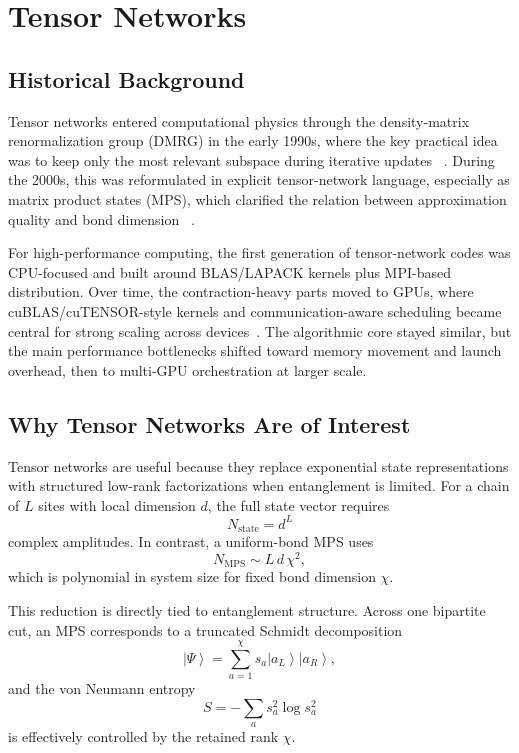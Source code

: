 \section{Tensor Networks}\label{sec:tensor-networks}

\subsection{Historical Background}\label{sec:tn-history}

Tensor networks entered computational physics through the density-matrix
renormalization group (DMRG) in the early 1990s, where the key practical idea
was to keep only the most relevant subspace during iterative updates
~\cite{white1992dmrg,white1993dmrg}. During the 2000s, this was reformulated in
explicit tensor-network language, especially as matrix product states (MPS),
which clarified the relation between approximation quality and bond dimension
~\cite{schollwock2011dmrg,orus2014practical-intro-tn}.

For high-performance computing, the first generation of tensor-network codes
was CPU-focused and built around BLAS/LAPACK kernels plus MPI-based
distribution. Over time, the contraction-heavy parts moved to GPUs, where
cuBLAS/cuTENSOR-style kernels and communication-aware scheduling became central
for strong scaling across devices~\cite{springer2017tensor,menczer2023massive,menczer2024efficient-dmrg-gpu}.
The algorithmic core stayed similar, but the main performance bottlenecks
shifted toward memory movement and launch overhead, then to multi-GPU
orchestration at larger scale.

\subsection{Why Tensor Networks Are of Interest}\label{sec:tn-interest}

Tensor networks are useful because they replace exponential state
representations with structured low-rank factorizations when entanglement is
limited. For a chain of $L$ sites with local dimension $d$, the full state
vector requires
\[
  N_{\text{state}} = d^L
\]
complex amplitudes. In contrast, a uniform-bond MPS uses
\[
  N_{\text{MPS}} \sim L\,d\,\chi^2,
\]
which is polynomial in system size for fixed bond dimension $\chi$.

This reduction is directly tied to entanglement structure. Across one bipartite
cut, an MPS corresponds to a truncated Schmidt decomposition
\[
  \left|\Psi\right\rangle = \sum_{a=1}^{\chi} s_a \left|a_L\right\rangle\left|a_R\right\rangle,
\]
and the von Neumann entropy
\[
  S = -\sum_a s_a^2 \log s_a^2
\]
is effectively controlled by the retained rank $\chi$.


